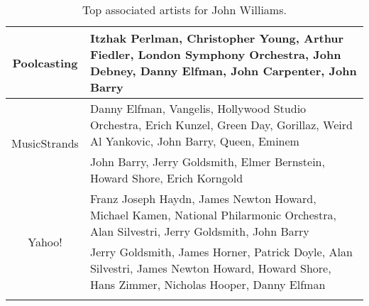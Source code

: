 \begin{table}[bhtp]\centering
\setlength{\extrarowheight}{3pt}
\setlength{\abovecaptionskip}{3pt}
\setlength{\belowcaptionskip}{3pt}
\setlength{\intextsep}{0pt}
\caption{Top associated artists for John Williams.}\label{table:samplerelevance4}
{\fontsize{8}{10}\selectfont
\begin{tabular}{|c|p{}|}
 \hline 
 \multirow{2}{*}{Poolcasting} &
 Itzhak Perlman, Christopher Young, Arthur Fiedler, London Symphony Orchestra, John Debney, Danny Elfman, John Carpenter, John Barry \vspace{2pt} \\
 \hline
 \multirow{2}{*}{MusicStrands} &
 Danny Elfman, Vangelis, Hollywood Studio Orchestra, Erich Kunzel, Green Day, Gorillaz, Weird Al Yankovic, John Barry, Queen, Eminem \vspace{2pt} \\
 \hline
 AllMusic &
 John Barry, Jerry Goldsmith, Elmer Bernstein, Howard Shore, Erich Korngold \vspace{2pt} \\
 \hline
 \multirow{2}{*}{Yahoo!} &
 Franz Joseph Haydn, James Newton Howard, Michael Kamen, National Philarmonic Orchestra, Alan Silvestri, Jerry Goldsmith, John Barry \vspace{2pt} \\
 \hline
 \multirow{2}{*}{Last.fm} &
 Jerry Goldsmith, James Horner, Patrick Doyle, Alan Silvestri, James Newton Howard, Howard Shore, Hans Zimmer, Nicholas Hooper, Danny Elfman \vspace{2pt} \\
 \hline
 \noalign{\bigskip}
\end{tabular}}
\end{table}
